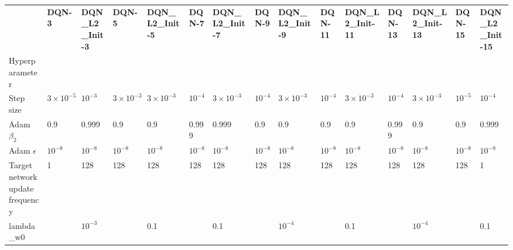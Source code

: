 \begin{tabular}{lllllllllllllll}
 & \bfseries DQN-3 & \bfseries DQN_L2_Init-3 & \bfseries DQN-5 & \bfseries DQN_L2_Init-5 & \bfseries DQN-7 & \bfseries DQN_L2_Init-7 & \bfseries DQN-9 & \bfseries DQN_L2_Init-9 & \bfseries DQN-11 & \bfseries DQN_L2_Init-11 & \bfseries DQN-13 & \bfseries DQN_L2_Init-13 & \bfseries DQN-15 & \bfseries DQN_L2_Init-15 \\
Hyperparameter &  &  &  &  &  &  &  &  &  &  &  &  &  &  \\
Step size & $3 \times 10^{-5}$ & $10^{-3}$ & $3 \times 10^{-3}$ & $3 \times 10^{-3}$ & $10^{-4}$ & $3 \times 10^{-3}$ & $10^{-4}$ & $3 \times 10^{-3}$ & $10^{-4}$ & $3 \times 10^{-3}$ & $10^{-4}$ & $3 \times 10^{-3}$ & $10^{-5}$ & $10^{-4}$ \\
Adam $\beta_2$ & 0.9 & 0.999 & 0.9 & 0.9 & 0.999 & 0.999 & 0.9 & 0.9 & 0.9 & 0.9 & 0.999 & 0.9 & 0.9 & 0.999 \\
Adam $\epsilon$ & $10^{-8}$ & $10^{-8}$ & $10^{-8}$ & $10^{-8}$ & $10^{-8}$ & $10^{-8}$ & $10^{-8}$ & $10^{-8}$ & $10^{-8}$ & $10^{-8}$ & $10^{-8}$ & $10^{-8}$ & $10^{-8}$ & $10^{-8}$ \\
Target network update frequency & 1 & 128 & 128 & 128 & 128 & 128 & 128 & 128 & 128 & 128 & 128 & 128 & 128 & 1 \\
lambda_w0 &  & $10^{-3}$ &  & 0.1 &  & 0.1 &  & $10^{-4}$ &  & 0.1 &  & $10^{-4}$ &  & 0.1 \\
\end{tabular}

